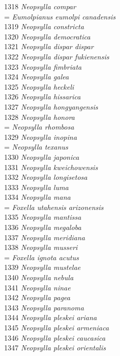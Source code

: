 \documentclass[
]{article}
\begin{document}
1318 \emph{Neopsylla compar}\\
= \emph{Eumolpianus eumolpi canadensis}\\
1319 \emph{Neopsylla constricta}\\
1320 \emph{Neopsylla democratica}\\
1321 \emph{Neopsylla dispar dispar}\\
1322 \emph{Neopsylla dispar fukienensis}\\
1323 \emph{Neopsylla fimbriata}\\
1324 \emph{Neopsylla galea}\\
1325 \emph{Neopsylla heckeli}\\
1326 \emph{Neopsylla hissarica}\\
1327 \emph{Neopsylla hongyangensis}\\
1328 \emph{Neopsylla honora}\\
= \emph{Neopsylla rhombosa}\\
1329 \emph{Neopsylla inopina}\\
= \emph{Neopsylla texanus}\\
1330 \emph{Neopsylla japonica}\\
1331 \emph{Neopsylla kweichowensis}\\
1332 \emph{Neopsylla longisetosa}\\
1333 \emph{Neopsylla luma}\\
1334 \emph{Neopsylla mana}\\
= \emph{Foxella utahensis arizonensis}\\
1335 \emph{Neopsylla mantissa}\\
1336 \emph{Neopsylla megaloba}\\
1337 \emph{Neopsylla meridiana}\\
1338 \emph{Neopsylla musseri}\\
= \emph{Foxella ignota acutus}\\
1339 \emph{Neopsylla mustelae}\\
1340 \emph{Neopsylla nebula}\\
1341 \emph{Neopsylla ninae}\\
1342 \emph{Neopsylla pagea}\\
1343 \emph{Neopsylla paranoma}\\
1344 \emph{Neopsylla pleskei ariana}\\
1345 \emph{Neopsylla pleskei armeniaca}\\
1346 \emph{Neopsylla pleskei caucasica}\\
1347 \emph{Neopsylla pleskei orientalis}\\
\end{document}
